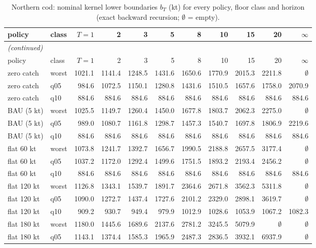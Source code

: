 \begingroup\footnotesize\setlength{\tabcolsep}{3pt}
\begin{longtable}{llrrrrrrrrr}
\caption{Northern cod: nominal kernel lower boundaries $b_T$ (kt) for every policy, floor class and horizon (exact backward recursion; $\emptyset$ = empty).}\label{tab:si-cod-kernels}\\
\toprule
policy & class & $T{=}1$ & 2 & 3 & 5 & 8 & 10 & 15 & 20 & $\infty$ \\
\midrule
\endfirsthead
\multicolumn{11}{l}{\emph{(continued)}}\\
\toprule
policy & class & $T{=}1$ & 2 & 3 & 5 & 8 & 10 & 15 & 20 & $\infty$ \\
\midrule
\endhead
\bottomrule
\endfoot
zero catch & worst & 1021.1 & 1141.4 & 1248.5 & 1431.6 & 1650.6 & 1770.9 & 2015.3 & 2211.8 & $\emptyset$ \\
zero catch & q05 & 984.6 & 1072.5 & 1150.1 & 1280.8 & 1431.6 & 1510.5 & 1657.6 & 1758.0 & 2070.9 \\
zero catch & q10 & 884.6 & 884.6 & 884.6 & 884.6 & 884.6 & 884.6 & 884.6 & 884.6 & 884.6 \\
BAU (5 kt) & worst & 1025.5 & 1149.7 & 1260.4 & 1450.0 & 1677.8 & 1803.7 & 2062.3 & 2275.0 & $\emptyset$ \\
BAU (5 kt) & q05 & 989.0 & 1080.7 & 1161.8 & 1298.7 & 1457.3 & 1540.7 & 1697.8 & 1806.9 & 2219.6 \\
BAU (5 kt) & q10 & 884.6 & 884.6 & 884.6 & 884.6 & 884.6 & 884.6 & 884.6 & 884.6 & 884.6 \\
flat 60 kt & worst & 1073.8 & 1241.7 & 1392.7 & 1656.7 & 1990.5 & 2188.8 & 2657.5 & 3177.4 & $\emptyset$ \\
flat 60 kt & q05 & 1037.2 & 1172.0 & 1292.4 & 1499.6 & 1751.5 & 1893.2 & 2193.4 & 2456.2 & $\emptyset$ \\
flat 60 kt & q10 & 884.6 & 884.6 & 884.6 & 884.6 & 884.6 & 884.6 & 884.6 & 884.6 & 884.6 \\
flat 120 kt & worst & 1126.8 & 1343.1 & 1539.7 & 1891.7 & 2364.6 & 2671.8 & 3562.3 & 5311.8 & $\emptyset$ \\
flat 120 kt & q05 & 1090.0 & 1272.7 & 1437.4 & 1727.6 & 2101.2 & 2329.0 & 2898.1 & 3619.7 & $\emptyset$ \\
flat 120 kt & q10 & 909.2 & 930.7 & 949.4 & 979.9 & 1012.9 & 1028.6 & 1053.9 & 1067.2 & 1082.3 \\
flat 180 kt & worst & 1180.0 & 1445.6 & 1689.6 & 2137.6 & 2781.2 & 3245.5 & 5079.9 & $\emptyset$ & $\emptyset$ \\
flat 180 kt & q05 & 1143.1 & 1374.4 & 1585.3 & 1965.9 & 2487.3 & 2836.5 & 3932.1 & 6937.9 & $\emptyset$ \\

\end{longtable}
